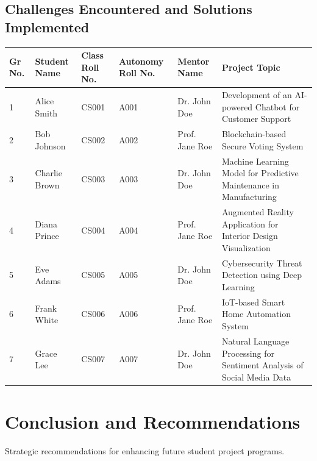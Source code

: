 \documentclass[11pt,a4paper]{article}
\newenvironment{card}{
    \begin{tcolorbox}[
        enhanced,
        colback=cardback,
        colframe=border,
        sharp corners,
        boxrule=0.5pt,
        drop shadow,
        drop shadow={shadow xshift=1mm,shadow yshift=-1mm,fill=border!50},
        boxsep=3mm,
        left=5mm, right=5mm, top=5mm, bottom=5mm,
        width=\textwidth,
        nobeforeafter
    ]
}{\end{tcolorbox}}
\begin{document}
\begin{card}
    \subsection*{\textcolor{accent}{Challenges Encountered and Solutions Implemented}}
    \vspace{0.3cm}
    \begin{longtable}{@{}p{}p{}p{}p{}p{}p{}@{}}
        \toprule
        \textbf{Gr No.} & \textbf{Student Name} & \textbf{Class Roll No.} & \textbf{Autonomy Roll No.} & \textbf{Mentor Name} & \textbf{Project Topic} \\
        \midrule
        \endhead
        1 & Alice Smith & CS001 & A001 & Dr. John Doe & Development of an AI-powered Chatbot for Customer Support \\
        2 & Bob Johnson & CS002 & A002 & Prof. Jane Roe & Blockchain-based Secure Voting System \\
        3 & Charlie Brown & CS003 & A003 & Dr. John Doe & Machine Learning Model for Predictive Maintenance in Manufacturing \\
        4 & Diana Prince & CS004 & A004 & Prof. Jane Roe & Augmented Reality Application for Interior Design Visualization \\
        5 & Eve Adams & CS005 & A005 & Dr. John Doe & Cybersecurity Threat Detection using Deep Learning \\
        6 & Frank White & CS006 & A006 & Prof. Jane Roe & IoT-based Smart Home Automation System \\
        7 & Grace Lee & CS007 & A007 & Dr. John Doe & Natural Language Processing for Sentiment Analysis of Social Media Data \\
        \bottomrule
    \end{longtable}
\end{card}

\clearpage

\section*{\textcolor{accent}{Conclusion and Recommendations}}
{\large\textcolor{muted}{Strategic recommendations for enhancing future student project programs.}}

\vspace{0.5cm}
\end{document}
